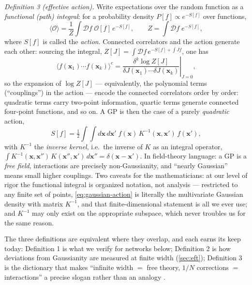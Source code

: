\documentclass[11pt]{article}
\newcommand{\bv}[1]{\boldsymbol{#1}}
\begin{document}
\emph{Definition 3 (effective action).} Write expectations over the random
function as a \emph{functional (path) integral}: for a probability density
$P[f] \propto e^{-S[f]}$ over functions,
\begin{equation}
  \label{eq:path-integral}
  \langle \mathcal{O} \rangle
  = \frac{1}{Z} \int \mathcal{D}f\; \mathcal{O}[f]\, e^{-S[f]},
  \qquad
  Z = \int \mathcal{D}f\; e^{-S[f]},
\end{equation}
where $S[f]$ is called the \emph{action}. Connected correlators and the
action generate each other: sourcing the integral,
$Z[J] = \int \mathcal{D}f\, e^{-S[f] + \int J f}$, one has
\begin{equation}
  \label{eq:generating}
  \langle f(\bv{x}_1)\cdots f(\bv{x}_k) \rangle^c
  = \left.\frac{\delta^k \log Z[J]}
  {\delta J(\bv{x}_1) \cdots \delta J(\bv{x}_k)}\right|_{J=0},
\end{equation}
so the expansion of $\log Z[J]$ --- equivalently, the polynomial terms
(``couplings'') in the action --- encode the connected correlators order
by order: quadratic terms carry two-point information, quartic terms
generate connected four-point functions, and so on. A GP is then the case
of a purely \emph{quadratic} action,
\begin{equation}
  \label{eq:gaussian-action}
  S[f] = \tfrac12 \int\!\!\int d\bv{x}\, d\bv{x}'\;
  f(\bv{x})\, K^{-1}(\bv{x},\bv{x}')\, f(\bv{x}'),
\end{equation}
with $K^{-1}$ the \emph{inverse kernel}, i.e.\ the inverse of $K$ as an
integral operator, $\int K^{-1}(\bv{x},\bv{x}'')\,K(\bv{x}'',\bv{x}')\,
d\bv{x}'' = \delta(\bv{x}-\bv{x}')$. In field-theory language: a GP is a
\emph{free field}, interactions are precisely non-Gaussianity, and
``nearly Gaussian'' means small higher couplings. Two caveats for the
mathematicians: at our level of rigor the functional integral is
organized notation, not analysis --- restricted to any finite set of
points, \cref{eq:gaussian-action} is literally the multivariate Gaussian
density with matrix $K^{-1}$, and that finite-dimensional statement is
all we ever use; and $K^{-1}$ may only exist on the appropriate
subspace, which never troubles us for the same reason.

The three definitions are equivalent where they overlap, and each earns
its keep today: Definition 1 is what we verify for networks below;
Definition 2 is how deviations from Gaussianity are measured at finite
width (\cref{sec:eft}); Definition 3 is the dictionary that makes
``infinite width $=$ free theory, $1/N$ corrections $=$ interactions'' a
precise slogan rather than an analogy \cite{roberts2022principles,
halverson2021neural}.
\end{document}

